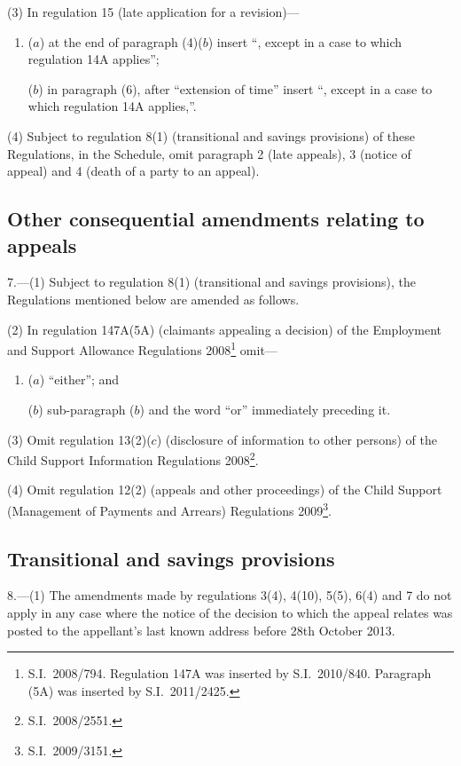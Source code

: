 \documentclass[12pt,a4paper]{article}
\begin{document}
(3) In regulation 15 (late application for a revision)—
\begin{enumerate}\item[]
($a$) at the end of paragraph (4)($b$)  insert “, except in a case to which regulation 14A applies”;

($b$) in paragraph (6), after “extension of time” insert “, except in a case to which regulation 14A applies,”.
\end{enumerate}

(4) Subject to regulation 8(1) (transitional and savings provisions) of these Regulations, in the Schedule, omit paragraph 2 (late appeals), 3 (notice of appeal) and 4 (death of a party to an appeal).

\subsection[7. Other consequential amendments relating to appeals]{Other consequential amendments relating to appeals}

7.---(1)  Subject to regulation 8(1) (transitional and savings provisions), the Regulations mentioned below are amended as follows.

(2) In regulation 147A(5A) (claimants appealing a decision) of the Employment and Support Allowance Regulations 2008\footnote{S.I.~2008/794. Regulation 147A was inserted by S.I.~2010/840. Paragraph (5A) was inserted by S.I.~2011/2425.} omit—
\begin{enumerate}\item[]
($a$) “either”; and

($b$) sub-paragraph ($b$)  and the word “or” immediately preceding it.
\end{enumerate}

(3) Omit regulation 13(2)($c$)  (disclosure of information to other persons) of the Child Support Information Regulations 2008\footnote{S.I.~2008/2551.}.

(4) Omit regulation 12(2) (appeals and other proceedings) of the Child Support (Management of Payments and Arrears) Regulations 2009\footnote{S.I.~2009/3151.}.

\subsection[8. Transitional and savings provisions]{Transitional and savings provisions}

8.---(1)  The amendments made by regulations 3(4), 4(10), 5(5), 6(4) and 7 do not apply in any case where the notice of the decision to which the appeal relates was posted to the appellant’s last known address before 28th October 2013.
\end{document}

